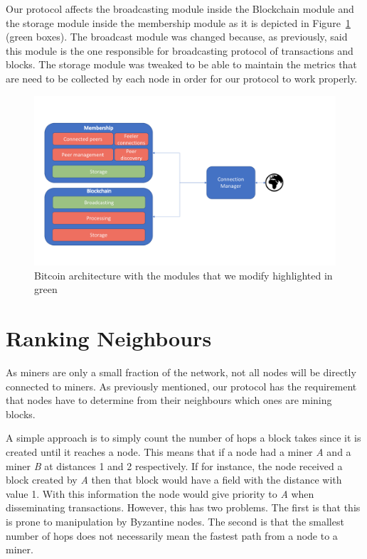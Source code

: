 Our protocol affects the broadcasting module inside the Blockchain module and the storage module inside the membership module as it is depicted in Figure~\ref{fig:arch} (green boxes). The broadcast module was changed because, as previously, said this module is the one responsible for broadcasting protocol of transactions and blocks. The storage module was tweaked to be able to maintain the metrics that are need to be collected by each node in order for our protocol to work properly.

\begin{figure}[h]
\centering
\includegraphics[scale=0.4]{figs/Architecture.png}
\caption{Bitcoin architecture with the modules that we modify highlighted in green}
\label{fig:arch}
\end{figure}


\section{Ranking Neighbours}
\label{sec:ranking}
As miners are only a small fraction of the network, not all nodes will be directly connected to miners.
As previously mentioned, our protocol has the requirement that nodes have to determine from their neighbours which ones are mining blocks.

A simple approach is to simply count the number of hops a block takes since it is created until it reaches a node. 
This means that if a node had a miner \textsl{A} and a miner \textsl{B} at distances 1 and 2 respectively. If for instance, the node received a block created by \textsl{A} then that block would have a field with the distance with value 1. With this information the node would give priority to \textsl{A} when disseminating transactions. 
However, this has two problems. The first is that this is prone to manipulation by Byzantine nodes. The second is that the smallest number of hops does not necessarily mean the fastest path from a node to a miner.

